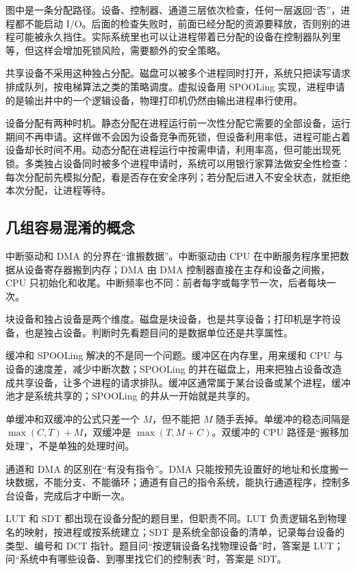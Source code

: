 图中是一条分配路径。设备、控制器、通道三层依次检查，任何一层返回“否”，进程都不能启动 I/O。后面的检查失败时，前面已经分配的资源要释放，否则别的进程可能被永久挡住。实际系统里也可以让进程带着已分配的设备在控制器队列里等，但这样会增加死锁风险，需要额外的安全策略。

共享设备不采用这种独占分配。磁盘可以被多个进程同时打开，系统只把读写请求排成队列，按电梯算法之类的策略调度。虚拟设备用 SPOOLing 实现，进程申请的是输出井中的一个逻辑设备，物理打印机仍然由输出进程串行使用。

设备分配有两种时机。静态分配在进程运行前一次性分配它需要的全部设备，运行期间不再申请。这样做不会因为设备竞争而死锁，但设备利用率低，进程可能占着设备却长时间不用。动态分配在进程运行中按需申请，利用率高，但可能出现死锁。多类独占设备同时被多个进程申请时，系统可以用银行家算法做安全性检查：每次分配前先模拟分配，看是否存在安全序列；若分配后进入不安全状态，就拒绝本次分配，让进程等待。

\subsection{几组容易混淆的概念}

中断驱动和 DMA 的分界在“谁搬数据”。中断驱动由 CPU 在中断服务程序里把数据从设备寄存器搬到内存；DMA 由 DMA 控制器直接在主存和设备之间搬，CPU 只初始化和收尾。中断频率也不同：前者每字或每字节一次，后者每块一次。

块设备和独占设备是两个维度。磁盘是块设备，也是共享设备；打印机是字符设备，也是独占设备。判断时先看题目问的是数据单位还是共享属性。

缓冲和 SPOOLing 解决的不是同一个问题。缓冲区在内存里，用来缓和 CPU 与设备的速度差，减少中断次数；SPOOLing 的井在磁盘上，用来把独占设备改造成共享设备，让多个进程的请求排队。缓冲区通常属于某台设备或某个进程，缓冲池才是系统共享的；SPOOLing 的井从一开始就是共享的。

单缓冲和双缓冲的公式只差一个 $M$，但不能把 $M$ 随手丢掉。单缓冲的稳态间隔是 $\max(C,T)+M$，双缓冲是 $\max(T,M+C)$。双缓冲的 CPU 路径是“搬移加处理”，不是单独的处理时间。

通道和 DMA 的区别在“有没有指令”。DMA 只能按预先设置好的地址和长度搬一块数据，不能分支、不能循环；通道有自己的指令系统，能执行通道程序，控制多台设备，完成后才中断一次。

LUT 和 SDT 都出现在设备分配的题目里，但职责不同。LUT 负责逻辑名到物理名的映射，按进程或按系统建立；SDT 是系统全部设备的清单，记录每台设备的类型、编号和 DCT 指针。题目问“按逻辑设备名找物理设备”时，答案是 LUT；问“系统中有哪些设备、到哪里找它们的控制表”时，答案是 SDT。

\newpage

